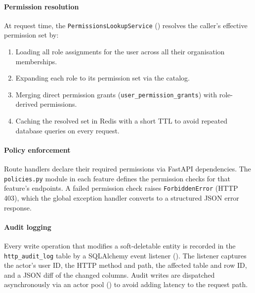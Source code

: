 \paragraph{Permission resolution}
At request time, the \texttt{PermissionsLookupService} () resolves the caller's effective permission set by:
\begin{enumerate}
    \item Loading all role assignments for the user across all their organisation memberships.
    \item Expanding each role to its permission set via the catalog.
    \item Merging direct permission grants (\texttt{user\_permission\_grants}) with role-derived permissions.
    \item Caching the resolved set in Redis with a short TTL to avoid repeated database queries on every request.
\end{enumerate}

\paragraph{Policy enforcement}
Route handlers declare their required permissions via FastAPI dependencies. The \texttt{policies.py} module in each feature defines the permission checks for that feature's endpoints. A failed permission check raises \texttt{ForbiddenError} (HTTP 403), which the global exception handler converts to a structured JSON error response.

\paragraph{Audit logging}
Every write operation that modifies a soft-deletable entity is recorded in the \texttt{http\_audit\_log} table by a SQLAlchemy event listener (). The listener captures the actor's user ID, the HTTP method and path, the affected table and row ID, and a JSON diff of the changed columns. Audit writes are dispatched asynchronously via an actor pool () to avoid adding latency to the request path.
